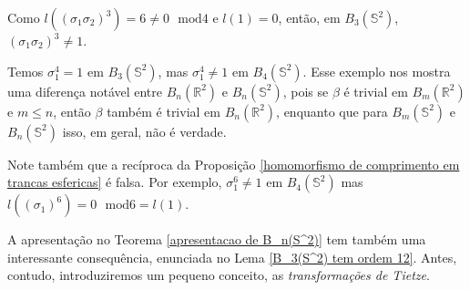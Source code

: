 	\begin{example}
    	Como $l((\sigma_1\sigma_2)^3) = 6\neq 0\text{ }\mathrm{mod}4$ e $l(1) = 0$, 
    	então, em $B_3(\mathbb{S}^2)$, $(\sigma_1\sigma_2)^3\neq 1$.
    \end{example}
    \begin{example}
    	Temos $\sigma_1^4=1$ em $B_3(\mathbb{S}^2)$, mas $\sigma_1^4\neq1$ em $B_4(\mathbb{S}^2)$. 
    	Esse exemplo nos mostra uma diferença notável entre $B_n(\mathbb{R}^2)$ e $B_n(\mathbb{S}^2)$, 
    	pois se $\beta$ é trivial em $B_m(\mathbb{R}^2)$ e $m\leq n$, então $\beta$ também 
    	é trivial em $B_n(\mathbb{R}^2)$, enquanto que para $B_m(\mathbb{S}^2)$ e $B_n(\mathbb{S}^2)$ 
    	isso, em geral, não é verdade.
	\end{example}
	Note também que a recíproca da Proposição \ref{homomorfismo de comprimento em trancas esfericas} 
	é falsa. Por exemplo, $\sigma_1^6\neq1$ em $B_4(\mathbb{S}^2)$ mas 
	$l((\sigma_1)^6) = 0\text{ }\mathrm{mod}6 = l(1)$.
	
	\par\vspace{0.3cm} A apresentação no Teorema \ref{apresentacao de B_n(S^2)} tem também 
	uma interessante consequência, enunciada no Lema \ref{B_3(S^2) tem ordem 12}. 
	Antes, contudo, introduziremos um pequeno conceito, as \textit{transformações de Tietze}.
